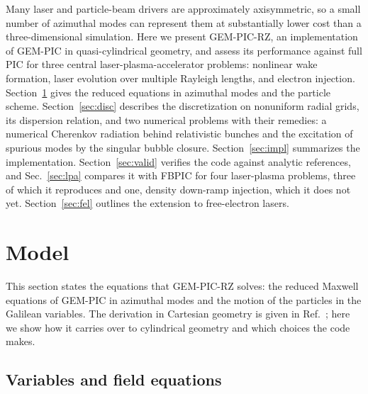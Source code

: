 \documentclass[preprint,12pt]{elsarticle}
\begin{document}
Many laser and particle-beam drivers are approximately axisymmetric, so a small number of azimuthal modes can represent them at substantially lower cost than a three-dimensional simulation. Here we present GEM-PIC-RZ, an implementation of GEM-PIC in quasi-cylindrical geometry, and assess its performance against full PIC for three central laser-plasma-accelerator problems: nonlinear wake formation, laser evolution over multiple Rayleigh lengths, and electron injection. Section~\ref{sec:model} gives the reduced equations in azimuthal modes and the particle scheme. Section~\ref{sec:disc} describes the discretization on nonuniform radial grids, its dispersion relation, and two numerical problems with their remedies: a numerical Cherenkov radiation behind relativistic bunches and the excitation of spurious modes by the singular bubble closure. Section~\ref{sec:impl} summarizes the implementation. Section~\ref{sec:valid} verifies the code against analytic references, and Sec.~\ref{sec:lpa} compares it with FBPIC for four laser-plasma problems, three of which it reproduces and one, density down-ramp injection, which it does not yet. Section~\ref{sec:fel} outlines the extension to free-electron lasers.


\section{Model}\label{sec:model}

This section states the equations that GEM-PIC-RZ solves: the reduced Maxwell equations of GEM-PIC in azimuthal modes and the motion of the particles in the Galilean variables. The derivation in Cartesian geometry is given in Ref.~\cite{GEMPIC}; here we show how it carries over to cylindrical geometry and which choices the code makes.

\subsection{Variables and field equations}
\end{document}
